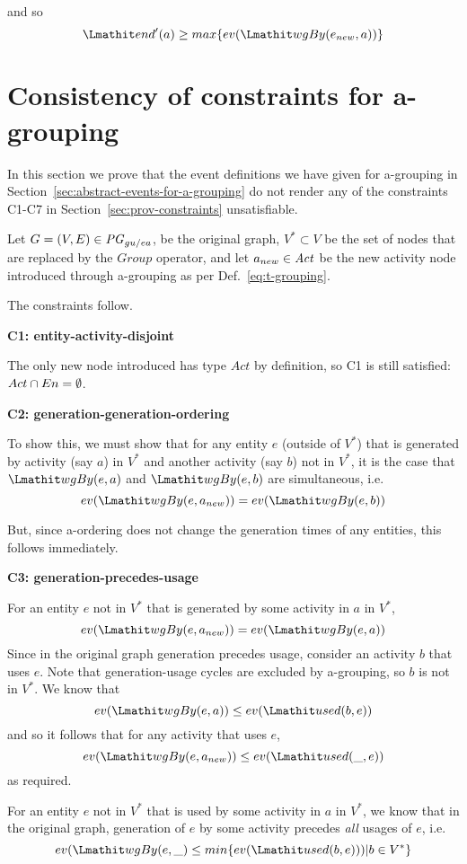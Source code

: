 and so
\[
\ed'(a) \geq max\{ev(\wgby(e_{new},a)) \}
\]




\section{Consistency of constraints for a-grouping}
\label{sec:consistency-constraints-a-grouping}

In this section we prove that the event definitions we have given for a-grouping in Section~\ref{sec:abstract-events-for-a-grouping} do not render any of the constraints C1-C7 in Section~\ref{sec:prov-constraints} unsatisfiable.

Let $G=(V,E) \in \mathit{PG}_{gu/ea}$, be the original graph,  $V^* \subset V$ be the set of nodes that are replaced by the $Group$ operator, and let  $a_{new} \in \mathit{Act}$ be the new activity node introduced through a-grouping as per Def.~\ref{eq:t-grouping}. 

The constraints follow.

\noindent
    {\bf C1: entity-activity-disjoint}

The only new node introduced has type $Act$ by definition, so C1 is still satisfied: $Act \cap En = \emptyset$.

\noindent
{\bf C2: generation-generation-ordering}

To show this, we must show that for any entity $e$ (outside of $V^*$)  that is generated by activity (say $a$) in $V^*$ and another activity (say $b$) not in $V^*$, it is the case that  $\wgby(e,a)$ and $\wgby(e,b)$ are simultaneous, i.e.
\[
ev(\wgby(e,a_{new})) = ev(\wgby(e,b))
\]

But, since a-ordering does not change the generation times of any entities, this follows immediately. 

\noindent
    {\bf C3: generation-precedes-usage}

For an entity $e$ not in $V^*$ that is generated by some activity in $a$ in $V^*$, 
\[
ev(\wgby(e,a_{new})) = ev(\wgby(e,a))
\]
Since in the original graph generation precedes usage, consider an activity $b$ that uses $e$. Note that generation-usage cycles are excluded by a-grouping, so $b$ is not in $V^*$. We know that 
\[
ev(\wgby(e,a)) \leq ev(\used(b,e))
\]
and so it follows that for any activity  that uses $e$,
\[
ev(\wgby(e,a_{new})) \leq ev(\used(\_,e))
\]
as required.  

For an entity $e$ not in $V^*$ that is used by some activity in $a$ in $V^*$, we know that in the original graph, generation of $e$ by some activity precedes \emph{all} usages of $e$, i.e.
\[
ev(\wgby(e,\_) \leq  min\{ev(\used(b,e))) | b \in V^*\}
\]

